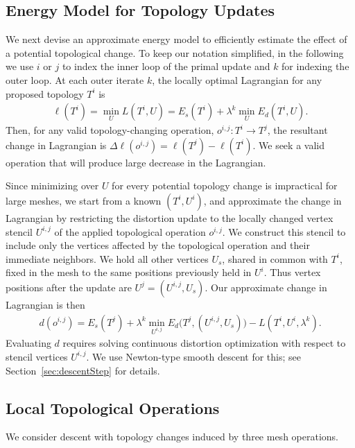 \subsection{Energy Model for Topology Updates}
\label{sec:topology_energy}
We next devise an approximate energy model to efficiently estimate the effect of a potential topological change. 
To keep our notation simplified, in the following we use $i$ or $j$ to index the inner loop of the primal update and $k$ for indexing the outer loop.
At each outer iterate $k$, the locally optimal Lagrangian for any proposed topology $T^i$ is  
\begin{align}
\ell(T^i) = \min_{U} L(T^i, U) = E_s(T^i) + \lambda^k \min_{U} E_d(T^i, U).
\end{align}
Then, for any valid topology-changing operation, $o^{i,j}:T^i \rightarrow T^j$, the resultant change in Lagrangian is $\Delta \ell(o^{i,j}) = \ell(T^j) - \ell(T^i)$. We seek a valid operation that will produce large decrease in the Lagrangian.


Since minimizing over $U$ for every potential topology change is 
impractical
for large meshes, we start from a known $(T^i, U^i)$, and approximate the change in Lagrangian by restricting the distortion update to the locally changed vertex stencil $U^{i,j}$ of the applied topological operation $o^{i,j}$. We construct this stencil to include only the vertices affected by the topological operation and their immediate neighbors.
We hold all other vertices $U_s$, shared in common with $T^i$, fixed in the mesh
to the same positions previously held in $U^i$. Thus vertex positions after the update are $U^j = (U^{i,j}, U_s)$.  Our approximate change in Lagrangian is then 
\begin{align} 
d(o^{i,j}) = E_s(T^j) + \lambda^k \min_{U^{i,j}} E_d \big( T^j, (U^{i,j}, U_s) \big) - L(T^i,U^i,\lambda^k).
\end{align}
%
Evaluating $d$ requires solving continuous distortion optimization with respect to stencil vertices $U^{i,j}$. We use Newton-type smooth descent for this; see Section~\ref{sec:descentStep} for details.

\subsection{Local Topological Operations}
\label{sec:topology_ops}

We consider descent with topology changes induced by three mesh operations.

